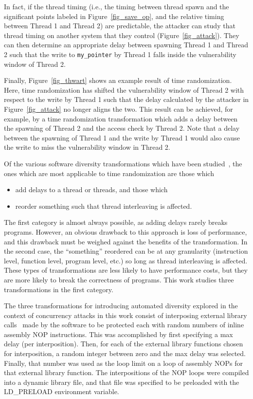 In fact, if the thread timing (i.e., the timing between thread spawn and the significant points labeled in Figure~\ref{fig_save_op}, and the relative timing between Thread 1 and Thread 2) are predictable, the attacker can study that thread timing on another system that they control (Figure~\ref{fig_attack}).
They can then determine an appropriate delay between spawning Thread 1 and Thread 2 such that the write to \texttt{my\_pointer} by Thread 1 falls inside the vulnerability window of Thread 2.

Finally, Figure~\ref{fig_thwart} shows an example result of time randomization.
Here, time randomization has shifted the vulnerability window of Thread 2 with respect to the write by Thread 1 such that the delay calculated by the attacker in Figure~\ref{fig_attack} no longer aligns the two.
This result can be achieved, for example, by a time randomization transformation which adds a delay between the spawning of Thread 2 and the access check by Thread 2.
Note that a delay between the spawning of Thread 1 and the write by Thread 1 would also cause the write to miss the vulnerability window in Thread 2.

Of the various software diversity transformations which have been studied~\cite{Larsen2014}, the ones which are most applicable to time randomization are those which
\begin{itemize}
	\item add delays to a thread or threads, and those which
	\item reorder something such that thread interleaving is affected.
\end{itemize}
The first category is almost always possible, as adding delays rarely breaks programs.
However, an obvious drawback to this approach is loss of performance, and this drawback must be weighed against the benefits of the transformation.
In the second case, the ``something'' reordered can be at any granularity (instruction level, function level, program level, etc.) so long as thread interleaving is affected.
These types of transformations are less likely to have performance costs, but they are more likely to break the correctness of programs.
This work studies three transformations in the first category.

The three transformations for introducing automated diversity explored in the context of concurrency attacks in this work consist of interposing external library calls~\cite{Conrad2009} made by the software to be protected each with random numbers of inline assembly NOP instructions.
This was accomplished by first specifying a max delay (per interposition).
Then, for each of the external library functions chosen for interposition, a random integer between zero and the max delay was selected.
Finally, that number was used as the loop limit on a loop of assembly NOPs for that external library function.
The interpositions of the NOP loops were compiled into a dynamic library file, and that file was specified to be preloaded with the LD\_PRELOAD environment variable.

